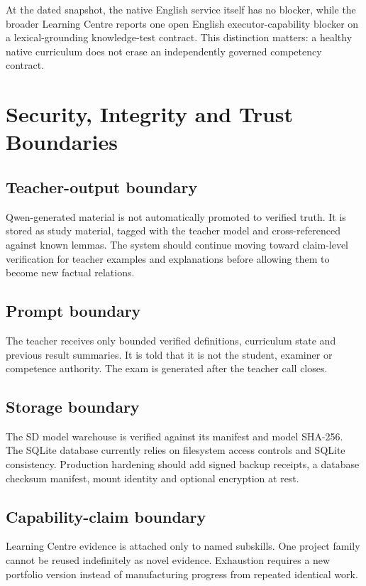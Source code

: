 \documentclass[11pt,a4paper]{article}
\begin{document}
At the dated snapshot, the native English service itself has no blocker, while the broader
Learning Centre reports one open English executor-capability blocker on a lexical-grounding
knowledge-test contract. This distinction matters: a healthy native curriculum does not erase
an independently governed competency contract.

\section{Security, Integrity and Trust Boundaries}

\subsection{Teacher-output boundary}

Qwen-generated material is not automatically promoted to verified truth. It is stored as
study material, tagged with the teacher model and cross-referenced against known lemmas. The
system should continue moving toward claim-level verification for teacher examples and
explanations before allowing them to become new factual relations.

\subsection{Prompt boundary}

The teacher receives only bounded verified definitions, curriculum state and previous result
summaries. It is told that it is not the student, examiner or competence authority. The exam
is generated after the teacher call closes.

\subsection{Storage boundary}

The SD model warehouse is verified against its manifest and model SHA-256. The SQLite database
currently relies on filesystem access controls and SQLite consistency. Production hardening
should add signed backup receipts, a database checksum manifest, mount identity and optional
encryption at rest.

\subsection{Capability-claim boundary}

Learning Centre evidence is attached only to named subskills. One project family cannot be
reused indefinitely as novel evidence. Exhaustion requires a new portfolio version instead of
manufacturing progress from repeated identical work.
\end{document}
